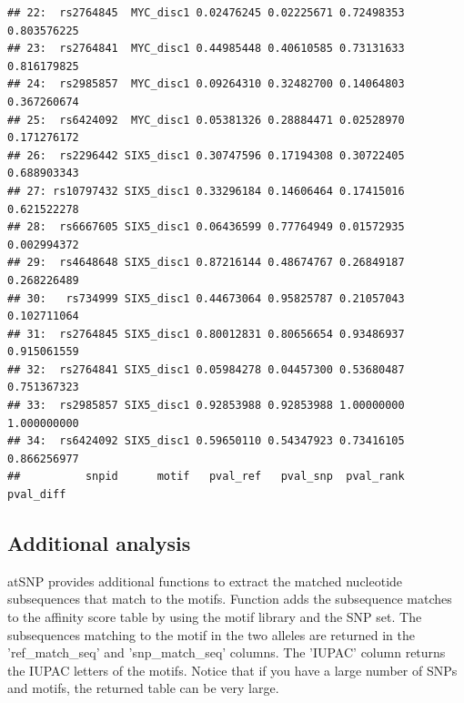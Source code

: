\documentclass[a4paper,10pt]{article}\usepackage[]{graphicx}\usepackage[]{color}
\makeatletter
\newenvironment{kframe}{%
 \def\at@end@of@kframe{}%
 \ifinner\ifhmode%
  \def\at@end@of@kframe{\end{minipage}}%
  \begin{minipage}{\columnwidth}%
 \fi\fi%
 \def\FrameCommand##1{\hskip\@totalleftmargin \hskip-\fboxsep
 \colorbox{shadecolor}{##1}\hskip-\fboxsep
     \hskip-\linewidth \hskip-\@totalleftmargin \hskip\columnwidth}%
 \MakeFramed {\advance\hsize-\width
   \@totalleftmargin\z@ \linewidth\hsize
   \@setminipage}}%
 {\par\unskip\endMakeFramed%
 \at@end@of@kframe}
\newenvironment{knitrout}{}{} %
\makeatother
\begin{document}
\begin{knitrout}
\begin{kframe}
\begin{verbatim}
## 22:  rs2764845  MYC_disc1 0.02476245 0.02225671 0.72498353 0.803576225
## 23:  rs2764841  MYC_disc1 0.44985448 0.40610585 0.73131633 0.816179825
## 24:  rs2985857  MYC_disc1 0.09264310 0.32482700 0.14064803 0.367260674
## 25:  rs6424092  MYC_disc1 0.05381326 0.28884471 0.02528970 0.171276172
## 26:  rs2296442 SIX5_disc1 0.30747596 0.17194308 0.30722405 0.688903343
## 27: rs10797432 SIX5_disc1 0.33296184 0.14606464 0.17415016 0.621522278
## 28:  rs6667605 SIX5_disc1 0.06436599 0.77764949 0.01572935 0.002994372
## 29:  rs4648648 SIX5_disc1 0.87216144 0.48674767 0.26849187 0.268226489
## 30:   rs734999 SIX5_disc1 0.44673064 0.95825787 0.21057043 0.102711064
## 31:  rs2764845 SIX5_disc1 0.80012831 0.80656654 0.93486937 0.915061559
## 32:  rs2764841 SIX5_disc1 0.05984278 0.04457300 0.53680487 0.751367323
## 33:  rs2985857 SIX5_disc1 0.92853988 0.92853988 1.00000000 1.000000000
## 34:  rs6424092 SIX5_disc1 0.59650110 0.54347923 0.73416105 0.866256977
##          snpid      motif   pval_ref   pval_snp  pval_rank   pval_diff
\end{verbatim}
\end{kframe}
\end{knitrout}

\subsection{Additional analysis}

atSNP provides additional functions to extract the matched nucleotide subsequences that match to the motifs. Function  adds the subsequence matches to the affinity score table by using the motif library and the SNP set. The subsequences matching to the motif in the two alleles are returned in the 'ref\_match\_seq' and 'snp\_match\_seq' columns. The 'IUPAC' column returns the IUPAC letters of the motifs. Notice that if you have a large number of SNPs and motifs, the returned table can be very large.
\end{document}
